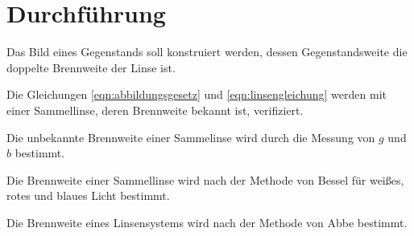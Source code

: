 \section{Durchführung}
\label{sec:Durchführung}

Das Bild eines Gegenstands soll konstruiert werden, dessen Gegenstandsweite die doppelte Brennweite der Linse ist. 

Die Gleichungen \eqref{eqn:abbildungsgesetz} und \eqref{eqn:linsengleichung} werden mit einer Sammellinse, deren Brennweite bekannt ist, verifiziert. 

Die unbekannte Brennweite einer Sammelinse wird durch die Messung von $g$ und $b$ bestimmt. 

Die Brennweite einer Sammellinse wird nach der Methode von Bessel für weißes, rotes und blaues Licht bestimmt. 

Die Brennweite eines Linsensystems wird nach der Methode von Abbe bestimmt. 
